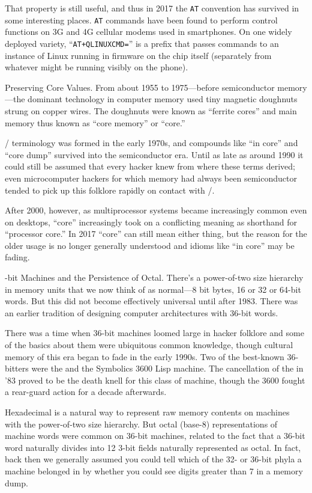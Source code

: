 That property is still useful, and thus in 2017 the {\tt AT} convention has survived
in some interesting places. {\tt AT} commands have been found to perform control
functions on 3G and 4G cellular modems used in smartphones. On one widely
deployed variety, ``{\tt AT+QLINUXCMD=}'' is a prefix that passes commands to an
instance of Linux running in firmware on the chip itself (separately from
whatever  might be running visibly on the phone).

\sect Preserving Core Values.
From about 1955 to 1975---before semiconductor memory---the dominant technology
in computer memory used tiny magnetic doughnuts strung on copper wires. The
doughnuts were known as ``ferrite cores'' and main memory thus known as ``core
memory'' or ``core.''

\UNIX/ terminology was formed in the early 1970s, and compounds like ``in core''
and ``core dump'' survived into the semiconductor era. Until as late as around
1990 it could still be assumed that every hacker knew from where these terms
derived; even microcomputer hackers for which memory had always been
semiconductor  tended to pick up this folklore rapidly on contact with \UNIX/.

After 2000, however, as multiprocessor systems became increasingly common even
on desktops, ``core'' increasingly took on a conflicting meaning as shorthand for
``processor core.'' In 2017 ``core'' can still mean either thing, but the reason
for the older usage is no longer generally understood and idioms like ``in core''
may be fading.

-bit Machines and the Persistence of Octal.
There's a power-of-two size hierarchy in memory units that we now think of as
normal---8 bit bytes, 16 or 32 or 64-bit words. But this did not become
effectively universal until after 1983. There was an earlier tradition of
designing computer architectures with 36-bit words.

There was a time when 36-bit machines loomed large in hacker folklore and some
of the basics about them were ubiquitous common knowledge, though cultural
memory of this era began to fade in the early 1990s. Two of the best-known
36-bitters were the  and the Symbolics 3600 Lisp machine. The
cancellation of the  in '83 proved to be the death knell for this class
of machine, though the 3600 fought a rear-guard action for a decade afterwards.

Hexadecimal is a natural way to represent raw memory contents on machines with
the power-of-two size hierarchy. But octal (base-8) representations of machine
words were common on 36-bit machines, related to the fact that a 36-bit word
naturally divides into 12 3-bit fields naturally represented as octal. In fact,
back then we generally assumed you could tell which of the 32- or 36-bit phyla
a machine belonged in by whether you could see digits greater than 7 in a
memory dump.

